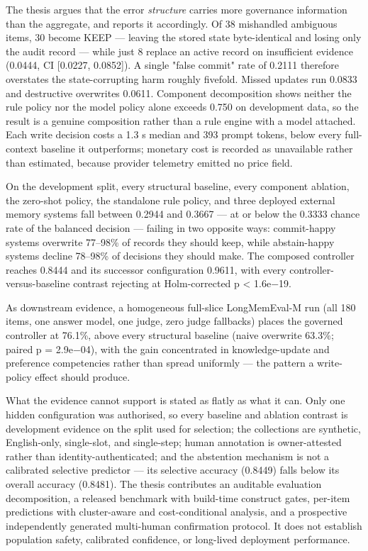 The thesis argues that the error \emph{structure} carries more
governance information than the aggregate, and reports it accordingly.
Of 38 mishandled ambiguous items, 30 become KEEP --- leaving the stored
state byte-identical and losing only the audit record --- while just 8
replace an active record on insufficient evidence (0.0444, CI {[}0.0227,
0.0852{]}). A single "false commit" rate of 0.2111 therefore overstates
the state-corrupting harm roughly fivefold. Missed updates run 0.0833
and destructive overwrites 0.0611. Component decomposition shows neither
the rule policy nor the model policy alone exceeds 0.750 on development
data, so the result is a genuine composition rather than a rule engine
with a model attached. Each write decision costs a 1.3 s median and 393
prompt tokens, below every full-context baseline it outperforms;
monetary cost is recorded as unavailable rather than estimated, because
provider telemetry emitted no price field.

On the development split, every structural baseline, every component
ablation, the zero-shot policy, the standalone rule policy, and three
deployed external memory systems fall between 0.2944 and 0.3667 --- at
or below the 0.3333 chance rate of the balanced decision --- failing in
two opposite ways: commit-happy systems overwrite 77--98\% of records
they should keep, while abstain-happy systems decline 78--98\% of
decisions they should make. The composed controller reaches 0.8444 and
its successor configuration 0.9611, with every
controller-versus-baseline contrast rejecting at Holm-corrected p
\textless{} 1.6e−19.

As downstream evidence, a homogeneous full-slice LongMemEval-M run (all
180 items, one answer model, one judge, zero judge fallbacks) places the
governed controller at 76.1\%, above every structural baseline (naive
overwrite 63.3\%; paired p = 2.9e−04), with the gain concentrated in
knowledge-update and preference competencies rather than spread
uniformly --- the pattern a write-policy effect should produce.

What the evidence cannot support is stated as flatly as what it can.
Only one hidden configuration was authorised, so every baseline and
ablation contrast is development evidence on the split used for
selection; the collections are synthetic, English-only, single-slot, and
single-step; human annotation is owner-attested rather than
identity-authenticated; and the abstention mechanism is not a calibrated
selective predictor --- its selective accuracy (0.8449) falls below its
overall accuracy (0.8481). The thesis contributes an auditable
evaluation decomposition, a released benchmark with build-time construct
gates, per-item predictions with cluster-aware and cost-conditional
analysis, and a prospective independently generated multi-human
confirmation protocol. It does not establish population safety,
calibrated confidence, or long-lived deployment performance.

